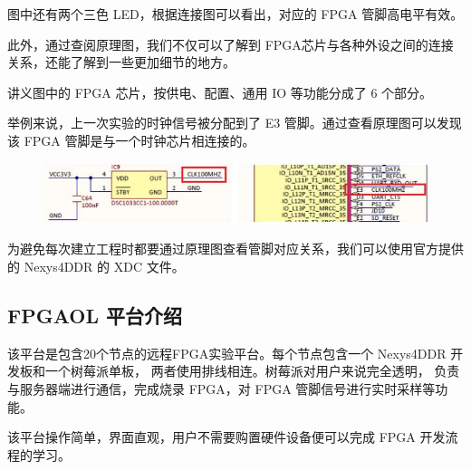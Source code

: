 \documentclass[UTF8]{article}
\begin{document}
	图中还有两个三色 LED，根据连接图可以看出，对应的 FPGA 管脚高电平有效。\par
	此外，通过查阅原理图，我们不仅可以了解到 FPGA芯片与各种外设之间的连接关系，还能了解到一些更加细节的地方。\par
	讲义图中的 FPGA 芯片，按供电、配置、通用 IO 等功能分成了 6 个部分。\par
	举例来说，上一次实验的时钟信号被分配到了 E3 管脚。通过查看原理图可以发现该 FPGA 管脚是与一个时钟芯片相连接的。\par
	\begin{figure}[H]
		\centering
		\includegraphics[width=1\linewidth]{s2_2.jpg}
		\label{s2_2}
	\end{figure}\par
	为避免每次建立工程时都要通过原理图查看管脚对应关系，我们可以使用官方提供的 Nexys4DDR 的 XDC 文件。\par
	
	\subsection{FPGAOL 平台介绍}
	该平台是包含20个节点的远程FPGA实验平台。每个节点包含一个 Nexys4DDR 开发板和一个树莓派单板，
	两者使用排线相连。树莓派对用户来说完全透明， 负责与服务器端进行通信，完成烧录 FPGA，对 FPGA 管脚信号进行实时采样等功能。\par
	该平台操作简单，界面直观，用户不需要购置硬件设备便可以完成 FPGA 开发流程的学习。\par
	
\end{document}
